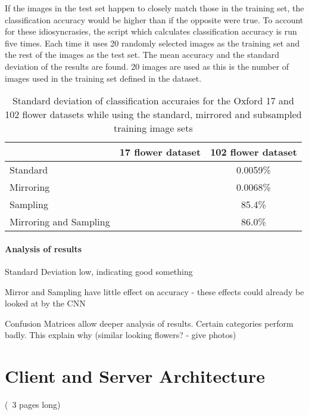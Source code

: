 \documentclass[11pt, a4paper]{report}
\begin{document}
If the images in the test set happen to closely match those in the training set, the classification accuracy would be higher than if the opposite were true. To account for these idiosyncrasies, the script which calculates classification accuracy is run five times. Each time it uses 20 randomly selected images as the training set and the rest of the images as the test set. The mean accuracy and the standard deviation of the results are found. 20 images are used as this is the number of images used in the training set defined in the dataset. 

\begin{table}[h]
\centering 
\renewcommand{\arraystretch}{1.3}
\begin{tabular}{l|cc}
  & {\bf 17 flower dataset} & {\bf 102 flower dataset} \\
  \hline
  Standard & & 0.0059\% \\
  Mirroring & & 0.0068\% \\
  Sampling & & 85.4\% \\
  Mirroring and Sampling & & 86.0\% 
\end{tabular}
\renewcommand{\arraystretch}{1}
\caption{Standard deviation of classification accuraies for the Oxford 17 and 102 flower datasets while using the standard, mirrored and subsampled training image sets}
\label{table:standarddeviation}
\end{table}

\subsubsection{Analysis of results}
Standard Deviation low, indicating good something

Mirror and Sampling have little effect on accuracy - these effects could already be looked at by the CNN

Confusion Matrices allow deeper analysis of results. Certain categories perform badly. This explain why (similar looking flowers? - give photos)




\chapter{Client and Server Architecture}

(~3 pages long)
\end{document}
